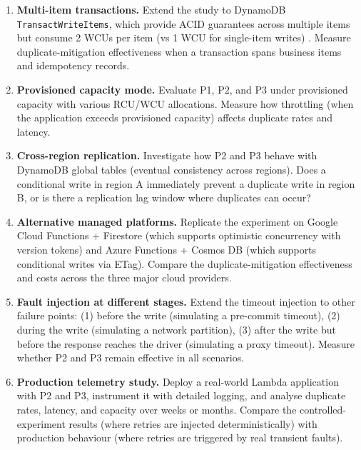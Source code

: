 \begin{enumerate}
    \item \textbf{Multi-item transactions.} Extend the study to DynamoDB \texttt{TransactWriteItems}, which provide ACID guarantees across multiple items but consume 2 WCUs per item (vs 1 WCU for single-item writes) \citep{Idziorek2023DynamoDBTx}. Measure duplicate-mitigation effectiveness when a transaction spans business items and idempotency records.
    
    \item \textbf{Provisioned capacity mode.} Evaluate P1, P2, and P3 under provisioned capacity with various RCU/WCU allocations. Measure how throttling (when the application exceeds provisioned capacity) affects duplicate rates and latency.
    
    \item \textbf{Cross-region replication.} Investigate how P2 and P3 behave with DynamoDB global tables (eventual consistency across regions). Does a conditional write in region A immediately prevent a duplicate write in region B, or is there a replication lag window where duplicates can occur?
    
    \item \textbf{Alternative managed platforms.} Replicate the experiment on Google Cloud Functions + Firestore (which supports optimistic concurrency with version tokens) and Azure Functions + Cosmos DB (which supports conditional writes via ETag). Compare the duplicate-mitigation effectiveness and costs across the three major cloud providers.
    
    \item \textbf{Fault injection at different stages.} Extend the timeout injection to other failure points: (1) before the write (simulating a pre-commit timeout), (2) during the write (simulating a network partition), (3) after the write but before the response reaches the driver (simulating a proxy timeout). Measure whether P2 and P3 remain effective in all scenarios.
    
    \item \textbf{Production telemetry study.} Deploy a real-world Lambda application with P2 and P3, instrument it with detailed logging, and analyse duplicate rates, latency, and capacity over weeks or months. Compare the controlled-experiment results (where retries are injected deterministically) with production behaviour (where retries are triggered by real transient faults).
\end{enumerate}

